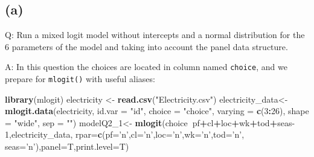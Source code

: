 \documentclass[
]{article}
\newenvironment{Shaded}{\begin{snugshade}}{\end{snugshade}}
\newcommand{\DataTypeTok}[1]{\textcolor[rgb]{0.13,0.29,0.53}{#1}}
\newcommand{\DecValTok}[1]{\textcolor[rgb]{0.00,0.00,0.81}{#1}}
\newcommand{\KeywordTok}[1]{\textcolor[rgb]{0.13,0.29,0.53}{\textbf{#1}}}
\newcommand{\NormalTok}[1]{#1}
\newcommand{\OperatorTok}[1]{\textcolor[rgb]{0.81,0.36,0.00}{\textbf{#1}}}
\newcommand{\StringTok}[1]{\textcolor[rgb]{0.31,0.60,0.02}{#1}}
\begin{document}
\hypertarget{twoa}{%
\subsection{(a)}\label{twoa}}

Q: Run a mixed logit model without intercepts and a normal distribution
for the 6 parameters of the model and taking into account the panel data
structure.

A: In this question the choices are located in column named
\texttt{choice}, and we prepare for \texttt{mlogit()} with useful
aliases:

\begin{Shaded}
\begin{Highlighting}[]
\KeywordTok{library}\NormalTok{(mlogit)}
\NormalTok{electricity <-}\StringTok{ }\KeywordTok{read.csv}\NormalTok{(}\StringTok{"Electricity.csv"}\NormalTok{)}
\NormalTok{electricity_data<-}\KeywordTok{mlogit.data}\NormalTok{(electricity, }\DataTypeTok{id.var =} \StringTok{"id"}\NormalTok{, }\DataTypeTok{choice =} \StringTok{"choice"}\NormalTok{,}
                      \DataTypeTok{varying =} \KeywordTok{c}\NormalTok{(}\DecValTok{3}\OperatorTok{:}\DecValTok{26}\NormalTok{), }\DataTypeTok{shape =} \StringTok{"wide"}\NormalTok{, }\DataTypeTok{sep =} \StringTok{""}\NormalTok{)}
\NormalTok{modelQ2_}\DecValTok{1}\NormalTok{<-}\StringTok{ }\KeywordTok{mlogit}\NormalTok{(choice}\OperatorTok{~}\NormalTok{pf}\OperatorTok{+}\NormalTok{cl}\OperatorTok{+}\NormalTok{loc}\OperatorTok{+}\NormalTok{wk}\OperatorTok{+}\NormalTok{tod}\OperatorTok{+}\NormalTok{seas}\DecValTok{-1}\NormalTok{,electricity_data, }\DataTypeTok{rpar=}\KeywordTok{c}\NormalTok{(}\DataTypeTok{pf=}\StringTok{'n'}\NormalTok{,}\DataTypeTok{cl=}\StringTok{'n'}\NormalTok{,}\DataTypeTok{loc=}\StringTok{'n'}\NormalTok{,}\DataTypeTok{wk=}\StringTok{'n'}\NormalTok{,}\DataTypeTok{tod=}\StringTok{'n'}\NormalTok{, }\DataTypeTok{seas=}\StringTok{'n'}\NormalTok{),}\DataTypeTok{panel=}\NormalTok{T,}\DataTypeTok{print.level=}\NormalTok{T)}
\end{Highlighting}
\end{Shaded}
\end{document}
